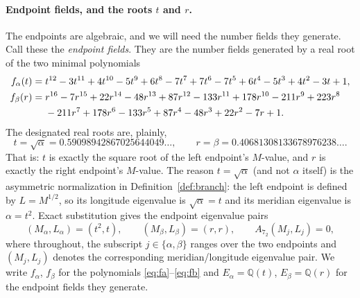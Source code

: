 \documentclass[11pt]{article}
\theoremstyle{definition}
\newcommand{\Q}{\mathbb{Q}}
\begin{document}
\paragraph{Endpoint fields, and the roots $t$ and $r$.}
The endpoints are algebraic, and we will need the number fields they generate.
Call these the \emph{endpoint fields}.  They are the number fields generated by
a real root of the two minimal polynomials
\begin{align}
 f_\alpha(t)={}&t^{12}-3t^{11}+4t^{10}-5t^9+6t^8-7t^7+7t^6
 -7t^5+6t^4-5t^3+4t^2-3t+1,\label{eq:fa}\\
 f_\beta(r)={}&r^{16}-7r^{15}+22r^{14}-48r^{13}+87r^{12}-133r^{11}
 +178r^{10}-211r^9+223r^8\notag\\
 &{}-211r^7+178r^6-133r^5+87r^4-48r^3+22r^2-7r+1.\label{eq:fb}
\end{align}
The designated real roots are, plainly,
\begin{equation}\label{eq:tr}
 t=\sqrt\alpha=0.59098942867025644049\ldots,
 \qquad
 r=\beta=0.40681308133678976238\ldots.
\end{equation}
That is: $t$ is exactly the square root of the left endpoint's $M$-value, and
$r$ is exactly the right endpoint's $M$-value.  The reason $t=\sqrt\alpha$ (and
not $\alpha$ itself) is the asymmetric normalization in
Definition~\ref{def:branch}: the left endpoint is defined by $L=M^{1/2}$, so its
longitude eigenvalue is $\sqrt\alpha=t$ and its meridian eigenvalue is
$\alpha=t^2$.  Exact substitution gives the endpoint eigenvalue pairs
\begin{equation}\label{eq:endpts}
 (M_\alpha,L_\alpha)=(t^2,t),\qquad
 (M_\beta,L_\beta)=(r,r),\qquad
 A_{7_2}(M_j,L_j)=0,
\end{equation}
where throughout, the subscript $j\in\{\alpha,\beta\}$ ranges over the two
endpoints and $(M_j,L_j)$ denotes the corresponding meridian/longitude
eigenvalue pair.  We write $f_\alpha$, $f_\beta$ for the polynomials
\eqref{eq:fa}--\eqref{eq:fb} and $E_\alpha=\Q(t)$, $E_\beta=\Q(r)$ for the
endpoint fields they generate.
\end{document}
